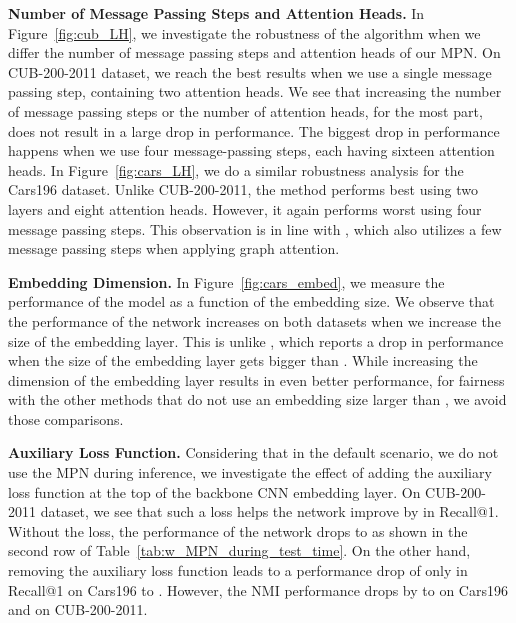 \documentclass{article}
\begin{document}
\noindent\textbf{Number of Message Passing Steps and Attention Heads.} In Figure~\ref{fig:cub_LH}, we investigate the robustness of the algorithm when we differ the number of message passing steps and attention heads of our MPN. On CUB-200-2011 dataset, we reach the best results when we use a single message passing step, containing two attention heads. We see that increasing the number of message passing steps or the number of attention heads, for the most part, does not result in a large drop in performance. The biggest drop in performance happens when we use four message-passing steps, each having sixteen attention heads. 
In Figure~\ref{fig:cars_LH}, we do a similar robustness analysis for the Cars196 dataset. Unlike CUB-200-2011, the method performs best using two layers and eight attention heads. However, it again performs worst using four message passing steps.
This observation is in line with \cite{DBLP:conf/iclr/VelickovicCCRLB18}, which also utilizes a few message passing steps when applying graph attention. 



\noindent\textbf{Embedding Dimension.} In Figure~\ref{fig:cars_embed}, we measure the performance of the model as a function of the embedding size. We observe that the performance of the network increases on both datasets when we increase the size of the embedding layer. This is unlike \cite{DDBLP:conf/cvpr/Wand2019}, which reports a drop in performance when the size of the embedding layer gets bigger than . While increasing the dimension of the embedding layer results in even better performance, for fairness with the other methods that do not use an embedding size larger than , we avoid those comparisons. 

\noindent\textbf{Auxiliary Loss Function.} Considering that in the default scenario, we do not use the MPN during inference, we investigate the effect of adding the auxiliary loss function at the top of the backbone CNN embedding layer. On CUB-200-2011 dataset, we see that such a loss helps the network improve by  in Recall@1. Without the loss, the performance of the network drops to  as shown in the second row of Table~\ref{tab:w_MPN_during_test_time}. On the other hand, removing the auxiliary loss function leads to a performance drop of only  in Recall@1 on Cars196 to . However, the NMI performance drops by  to  on Cars196 and  on CUB-200-2011. 
\end{document}
